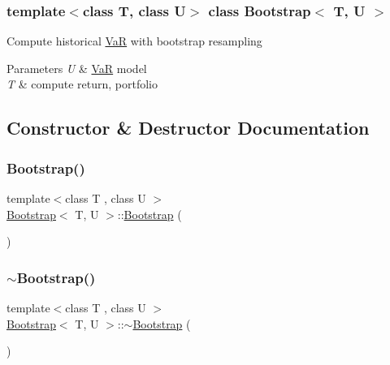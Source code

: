 \subsubsection*{template$<$class T, class U$>$\newline
class Bootstrap$<$ T, U $>$}

Compute historical \hyperlink{classVaR}{VaR} with bootstrap resampling


\begin{DoxyParams}{Parameters}
{\em U} & \hyperlink{classVaR}{VaR} model \\
\hline
{\em T} & compute return, portfolio \\
\hline
\end{DoxyParams}


\subsection{Constructor \& Destructor Documentation}
\hypertarget{classBootstrap_a35eb4a8e35d20976bd01125462192e33}{}\label{classBootstrap_a35eb4a8e35d20976bd01125462192e33} 
\subsubsection{\texorpdfstring{Bootstrap()}{Bootstrap()}}
{\footnotesize\ttfamily template$<$class T , class U $>$ \\
\hyperlink{classBootstrap}{Bootstrap}$<$ T, U $>$\+::\hyperlink{classBootstrap}{Bootstrap} (\begin{DoxyParamCaption}{ }\end{DoxyParamCaption})\hspace{0.3cm}{\ttfamily [inline]}}

\hypertarget{classBootstrap_aabc424eb11af216716a5ce6169953b26}{}\label{classBootstrap_aabc424eb11af216716a5ce6169953b26} 
\subsubsection{\texorpdfstring{$\sim$\+Bootstrap()}{~Bootstrap()}}
{\footnotesize\ttfamily template$<$class T , class U $>$ \\
\hyperlink{classBootstrap}{Bootstrap}$<$ T, U $>$\+::$\sim$\hyperlink{classBootstrap}{Bootstrap} (\begin{DoxyParamCaption}{ }\end{DoxyParamCaption})\hspace{0.3cm}{\ttfamily [inline]}}



